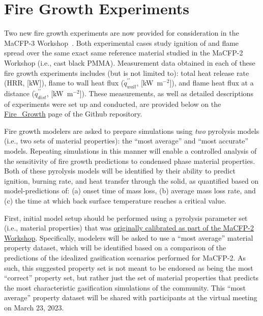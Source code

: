\documentclass[12pt]{article}
\newcommand{\pp}{\prime\prime}
\begin{document}
\clearpage
\section{Fire Growth Experiments}
\label{Sec:Fire Growth}
Two new fire growth experiments are now provided for consideration in the MaCFP-3 Workshop~\cite{chaudhari2021experimental, Leventon2022ParallelPanel}. Both experimental cases study ignition of and flame spread over the same exact same reference material studied in the MaCFP-2 Workshop (i.e., cast black PMMA). Measurement data obtained in each of these fire growth experiments includes (but is not limited to): total heat release rate (HRR, [kW]), flame to wall heat flux ($\dot{q}^{\pp}_{wall}$, [kW~m$^{-2}$]), and flame heat flux at a distance ($\dot{q}^{\pp}_{dist}$, [kW~m$^{-2}$]). These measurements, as well as detailed descriptions of experiments were set up and conducted, are provided below on the \href{https://github.com/MaCFP/macfp-db/tree/master/Fire_Growth}{Fire\_Growth} page of the Github repository.

Fire growth modelers are asked to prepare simulations using \emph{two} pyrolysis models (i.e., two sets of material properties): the ``most average'' and ``most accurate'' models. Repeating simulations in this manner will enable a controlled analysis of the sensitivity of fire growth predictions to condensed phase material properties. Both of these pyrolysis models will be identified by their ability to predict ignition, burning rate, and heat transfer through the solid, as quantified based on model-predictions of: (a) onset time of mass loss, (b) average mass loss rate, and (c) the time at which back surface temperature reaches a critical value.

First, initial model setup should be performed using a pyrolysis parameter set (i.e., material properties) that was \href{https://github.com/MaCFP/matl-db/tree/master/PMMA/Material_Properties}{originally calibrated as part of the MaCFP-2 Workshop}. Specifically, modelers will be asked to use a ``most average'' material property dataset, which will be identified based on a comparison of the predictions of the idealized gasification scenarios performed for MaCFP-2. As such, this suggested property set is not meant to be endorsed as being the most ``correct'' property set, but rather just the set of material properties that predicts the most characteristic gasification simulations of the community. This ``most average'' property dataset will be shared with participants at the virtual meeting on March 23, 2023.
\end{document}

